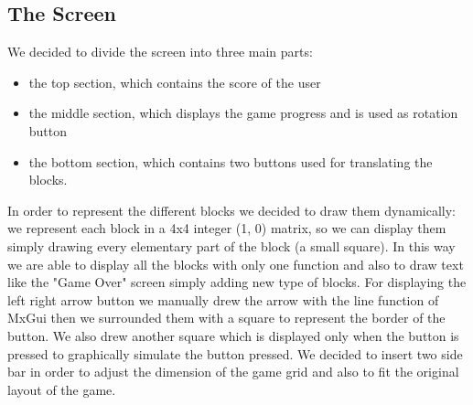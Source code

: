 	\subsection{The Screen}
		We decided to divide the screen into three main parts:
		\begin{itemize}
			\item the top section, which contains the score of the user
			\item the middle section, which displays the game progress and is used as rotation button
			\item the bottom section, which contains two buttons used for translating the blocks.
		\end{itemize} 
		In order to represent the different blocks we decided to draw them dynamically: we represent each block in a 4x4 integer (1, 0) matrix, so we can 
		display them simply drawing every elementary part of the block (a small square).
		In this way we are able to display all the blocks with only one function and also to draw text like the "Game Over" screen simply adding new type of blocks.
		For displaying the left right arrow button we manually drew the arrow with the line function of MxGui then we surrounded them with a square to represent the border of the button.
		We also drew another square which is displayed only when the button is pressed to graphically simulate the button pressed.
		We decided to insert two side bar in order to adjust the dimension of the game grid and also to fit the original layout of the game.
	